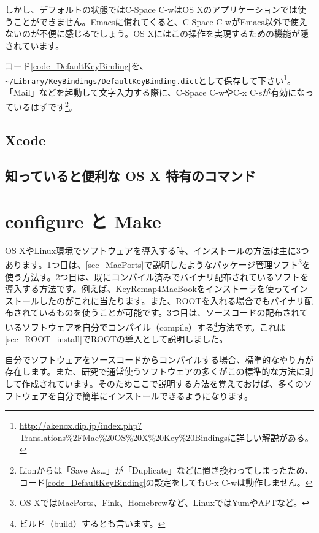 しかし、デフォルトの状態ではC-Space C-wはOS Xのアプリケーションでは使うことができません。Emacsに慣れてくると、C-Space C-wがEmacs以外で使えないのが不便に感じるでしょう。OS Xにはこの操作を実現するための機能が隠されています。

コード\ref{code_DefaultKeyBinding}を、\texttt{\~{}/Library/KeyBindings/DefaultKeyBinding.dict}として保存して下さい\footnote{\url{http://akenox.dip.jp/index.php?Translations\%2FMac\%20OS\%20X\%20Key\%20Bindings}に詳しい解説がある。}。「Mail」などを起動して文字入力する際に、C-Space C-wやC-x C-sが有効になっているはずです\footnote{Lionからは「Save As\ldots」が「Duplicate」などに置き換わってしまったため、コード\ref{code_DefaultKeyBinding}の設定をしてもC-x C-wは動作しません。}。



\section{Xcode}

\section{知っていると便利な OS X 特有のコマンド}

\chapter{configure と Make}

OS XやLinux環境でソフトウェアを導入する時、インストールの方法は主に3つあります。1つ目は、\ref{sec_MacPorts}で説明したようなパッケージ管理ソフト\footnote{OS XではMacPorts、Fink、Homebrewなど、LinuxではYumやAPTなど。}を使う方法す。2つ目は、既にコンパイル済みでバイナリ配布されているソフトを導入する方法です。例えば、KeyRemap4MacBookをインストーラを使ってインストールしたのがこれに当たります。また、ROOTを入れる場合でもバイナリ配布されているものを使うことが可能です。3つ目は、ソースコードの配布されているソフトウェアを自分でコンパイル（compile）する\footnote{ビルド（build）するとも言います。}方法です。これは\ref{sec_ROOT_install}でROOTの導入として説明しました。

自分でソフトウェアをソースコードからコンパイルする場合、標準的なやり方が存在します。また、研究で通常使うソフトウェアの多くがこの標準的な方法に則して作成されています。そのためここで説明する方法を覚えておけば、多くのソフトウェアを自分で簡単にインストールできるようになります。

